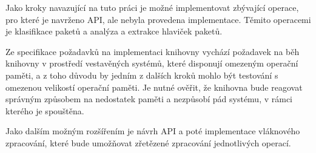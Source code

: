 Jako kroky navazující na tuto práci je možné implementovat zbývající operace, pro které je navrženo API, ale nebyla provedena implementace. Těmito operacemi je klasifikace paketů a analýza a extrakce hlaviček paketů.

Ze specifikace požadavků na implementaci knihovny vychází požadavek na běh knihovny v prostředí
vestavěných systémů, které disponují omezeným operační paměti, a z toho
důvodu by jedním z dalších kroků mohlo být testování s omezenou velikostí operační paměti.
Je nutné ověřit, že knihovna bude reagovat správným způsobem na nedostatek paměti a nezpůsobí pád systému,
v rámci kterého je spouštěna.

Jako dalším možným rozšířením je návrh API a poté implementace vláknového zpracování, které bude
umožňovat zřetězené zpracování jednotlivých operací.
